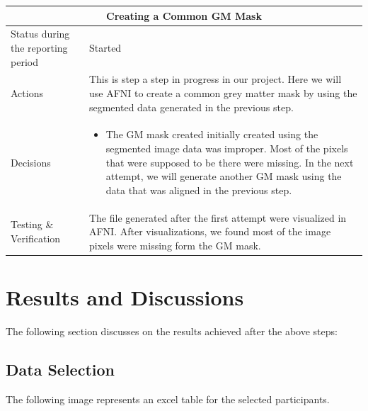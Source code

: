 \documentclass[12pt]{article}
\begin{document}
\begin{table}[H]
  \centering
  \begin{tabular} {| m{3.3cm} | m{11.5cm} | }
    \hline
    \multicolumn{2}{|c|}{Creating a Common GM Mask} \\ \hline
    Status during the reporting period & Started    \\ \hline
    Actions &
    This is step a step in progress in our project. Here we will use
    AFNI to create a common grey matter mask by using the segmented
    data generated in the previous step. \\ \hline

    Decisions &
    \begin{itemize}

      \item The GM mask created initially created using the segmented
        image data was improper. Most of the pixels that were supposed
        to be there were missing. In the next attempt, we will
        generate another GM mask using the data that was aligned in
        the previous step.

    \end{itemize} \\ \hline

    Testing \& Verification &
    The file generated after the first attempt were visualized in
    AFNI. After visualizations, we found most of the image pixels were
    missing form the GM mask. \\ \hline

  \end{tabular}
\end{table}

\newpage
\section{Results and Discussions}

The following section discusses on the results achieved after the
above steps:

\subsection{Data Selection}%
\label{sub:data_selection}

The following image represents an excel table for the selected
participants.
\end{document}
